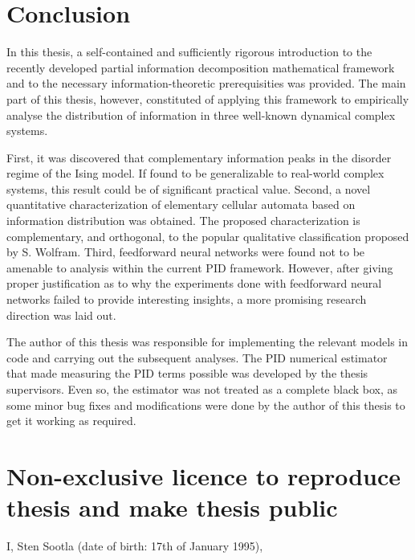 \documentclass[12pt]{article}
\begin{document}
\newpage
\section*{Conclusion}

In this thesis, a self-contained and sufficiently rigorous introduction to the recently developed partial information decomposition mathematical framework and to the necessary information-theoretic prerequisities was provided. The main part of this thesis, however, constituted of applying this framework to empirically analyse the distribution of information in three well-known dynamical complex systems. 

First, it was discovered that complementary information peaks in the disorder regime of the Ising model. If found to be generalizable to real-world complex systems, this result could be of significant practical value. Second, a novel quantitative characterization of elementary cellular automata based on information distribution was obtained. The proposed characterization is complementary, and orthogonal, to the popular qualitative classification proposed by S. Wolfram. Third, feedforward neural networks were found not to be amenable to analysis within the current PID framework. However, after giving proper justification as to why the experiments done with feedforward neural networks failed to provide interesting insights, a more promising research direction was laid out. 

The author of this thesis was responsible for implementing the relevant models in code and carrying out the subsequent analyses. 
The PID numerical estimator that made measuring the PID terms possible was developed by the thesis supervisors. Even so, the estimator was not treated as a complete black box, as some minor bug fixes and modifications were done by the author of this thesis to get it working as required. 


\newpage



\appendix
\pagebreak
\section*{\small Non-exclusive licence to reproduce thesis and make thesis public}

I, Sten Sootla (date of birth: 17th of January 1995),
\end{document}
